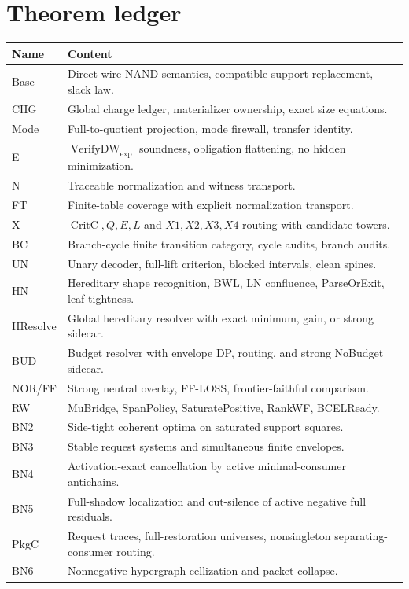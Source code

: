 \documentclass[10.5pt,a4paper]{article}
\newcommand{\VerifyDW}{\operatorname{VerifyDW}_{\exp}}
\newcommand{\CritC}{\operatorname{CritC}}
\begin{document}
\section{Theorem ledger}
\begin{longtable}{>{\raggedright\arraybackslash}p{}p{}}
\toprule
Name & Content\\
\midrule
Base & Direct-wire NAND semantics, compatible support replacement, slack law.\\
CHG & Global charge ledger, materializer ownership, exact size equations.\\
Mode & Full-to-quotient projection, mode firewall, transfer identity.\\
E & \(\VerifyDW\) soundness, obligation flattening, no hidden minimization.\\
N & Traceable normalization and witness transport.\\
FT & Finite-table coverage with explicit normalization transport.\\
X & \(\CritC,Q,E,L\) and \(X1,X2,X3,X4\) routing with candidate towers.\\
BC & Branch-cycle finite transition category, cycle audits, branch audits.\\
UN & Unary decoder, full-lift criterion, blocked intervals, clean spines.\\
HN & Hereditary shape recognition, BWL, LN confluence, ParseOrExit, leaf-tightness.\\
HResolve & Global hereditary resolver with exact minimum, gain, or strong sidecar.\\
BUD & Budget resolver with envelope DP, routing, and strong NoBudget sidecar.\\
NOR/FF & Strong neutral overlay, FF-LOSS, frontier-faithful comparison.\\
RW & MuBridge, SpanPolicy, SaturatePositive, RankWF, BCELReady.\\
BN2 & Side-tight coherent optima on saturated support squares.\\
BN3 & Stable request systems and simultaneous finite envelopes.\\
BN4 & Activation-exact cancellation by active minimal-consumer antichains.\\
BN5 & Full-shadow localization and cut-silence of active negative full residuals.\\
PkgC & Request traces, full-restoration universes, nonsingleton separating-consumer routing.\\
BN6 & Nonnegative hypergraph cellization and packet collapse.\\

\end{longtable}
\end{document}
